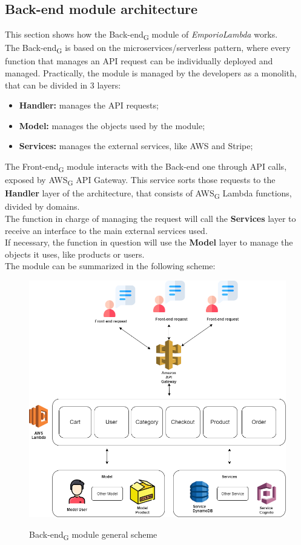 \subsection{Back-end module architecture}
This section shows how the Back-end\textsubscript{G} module of \textit{EmporioLambda} works. \\The Back-end\textsubscript{G} is based on the microservices/serverless pattern, where every function that manages an API request can be individually deployed and managed. Practically, the module is managed by the developers as a monolith, that can be divided in 3 layers:
\begin{itemize}
\item \textbf{Handler:} manages the API requests;
\item \textbf{Model:} manages the objects used by the module;
\item \textbf{Services:} manages the external services, like AWS and Stripe;
\end{itemize} 

The Front-end\textsubscript{G} module interacts with the Back-end one through API calls, exposed by AWS\textsubscript{G} API Gateway. This service sorts those requests to the \textbf{Handler} layer of the architecture, that consists of AWS\textsubscript{G} Lambda functions, divided by domains.\\
The function in charge of managing the request will call the \textbf{Services} layer to receive an interface to the main external services used.\\
If necessary, the function in question will use the \textbf{Model} layer to manage the objects it uses, like products or users.\\

The module can be summarized in the following scheme: 

\begin{figure}[H]
\centering
\includegraphics[scale=0.45]{res/Architettura/Backend/img/layerBack-end}\\
\caption{Back-end\textsubscript{G} module general scheme}
\end{figure}

